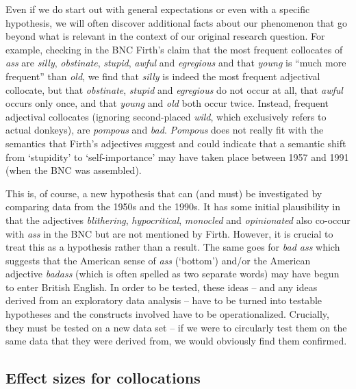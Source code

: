 Even if we do start out with general expectations or even with a specific hypothesis, we will often discover additional facts about our phenomenon that go beyond what is relevant in the context of our original research question. For example, checking in the BNC  Firth's claim that the most frequent collocates  of \textit{ass} are \textit{silly}, \textit{obstinate}, \textit{stupid}, \textit{awful} and \textit{egregious} and that \textit{young} is ``much more frequent''  than \textit{old}, we find that \textit{silly} is indeed the most frequent adjectival  collocate, but that \textit{obstinate}, \textit{stupid} and \textit{egregious} do not occur at all, that \textit{awful} occurs only once, and that \textit{young} and \textit{old} both occur twice. Instead, frequent adjectival  collocates (ignoring second\hyp{}placed \textit{wild}, which exclusively refers to actual donkeys), are \textit{pompous} and \textit{bad}. \textit{Pompous} does not really fit with the semantics  that Firth's adjectives  suggest and could indicate that a semantic shift from `stupidity' to `self\hyp{}importance' may have taken place between 1957 and 1991 (when the BNC  was assembled).

This is, of course, a new hypothesis that can (and must) be investigated by comparing data from the 1950s and the 1990s. It has some initial plausibility in that the adjectives  \textit{blithering}, \textit{hypocritical}, \textit{monocled} and \textit{opinionated} also co\hyp{}occur with \textit{ass} in the BNC  but are not mentioned by Firth. However, it is crucial to treat this as a hypothesis rather than a result. The same goes for \textit{bad ass} which suggests that the American  sense of \textit{ass} (`bottom') and\slash or the American adjective  \textit{badass} (which is often spelled as two separate words) may have begun to enter British  English. In order to be tested, these ideas -- and any ideas derived from an exploratory  data analysis -- have to be turned into testable hypotheses and the constructs involved have to be operationalized.  Crucially, they must be tested on a new data set -- if we were to circularly test them on the same data that they were derived from, we would obviously find them confirmed.

\subsection{Effect sizes for collocations}\label{sec:effectsizesforcollocations}\largerpage

